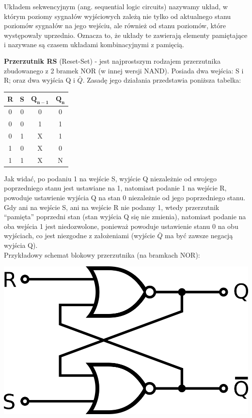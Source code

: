 \documentclass[12pt]{article}
\begin{document}
    \begin{definition}
	Układem sekwencyjnym (ang. sequential logic circuits) nazywamy układ, w którym poziomy sygnałów wyjściowych zależą nie tylko od aktualnego stanu poziomów sygnałów na jego wejściu,
	ale również od stanu poziomów, które występowały uprzednio. Oznacza to, że układy te zawierają elementy pamiętające i nazywane są czasem układami kombinacyjnymi z pamięcią.
    \end{definition}
    
    \begin{definition}
    	\textbf{Przerzutnik RS} (Reset-Set) - jest najprostszym rodzajem przerzutnika zbudowanego z 2 bramek NOR (w innej wersji NAND). Posiada dwa wejścia: S i R; oraz dwa wyjścia Q i $\bar{Q}$.
    	Zasadę jego działania przedstawia poniższa tabelka:
    	\begin{table}[H]
    	\center
	\begin{tabular}{|c|c|c|c|}
	\hline
	\textbf{R} & \textbf{S} & $\mathbf{Q_{n-1}}$ & $\mathbf{Q_n}$ \\ \hline
	0          & 0          & 0                  & 0              \\ \hline
	0          & 0          & 1                  & 1              \\ \hline
	0          & 1          & X                  & 1              \\ \hline
	1          & 0          & X                  & 0              \\ \hline
	1          & 1          & X                  & N              \\ \hline
	\end{tabular}
	\end{table}
	Jak widać, po podaniu 1 na wejście S, wyjście Q niezależnie od swojego poprzedniego stanu jest ustawiane na 1, natomiast podanie 1 na wejście R, powoduje ustawienie wyjścia Q na stan 0 niezależnie od jego poprzedniego stanu. Gdy ani na wejście S, ani na wejście R nie podamy 1, wtedy przerzutnik ``pamięta'' poprzedni stan (stan wyjścia Q się nie zmienia), natomiast podanie na oba wejścia 1 jest niedozwolone, ponieważ powoduje ustawienie stanu 0 na obu wyjściach, co jest niezgodne z założeniami (wyjście $\bar{Q}$ ma być zawsze negacją wyjścia Q). \\
	\noindent Przykładowy schemat blokowy przerzutnika (na bramkach NOR): \\
	
	\begin{center}
		\includegraphics[width=0.5\linewidth]{sequentials/rs.png}
	\end{center}
	
    \end{definition}
    
\end{document}
